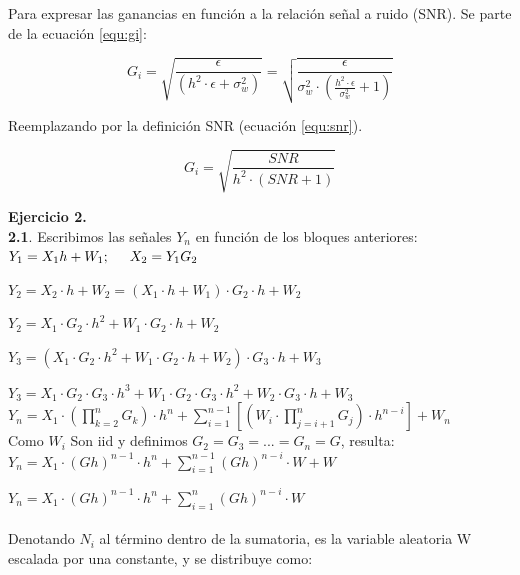 \hfill

Para expresar las ganancias en función a la relación señal a ruido (SNR). Se parte de la ecuación \ref{equ:gi}:

\begin{equation}
G_{i}  = \sqrt{ \frac{\epsilon}{(h^2 \cdot \epsilon + \sigma_w^2)}} = \sqrt{ \frac{\epsilon}{\sigma_w^2\cdot (\frac{h^2 \cdot \epsilon}{\sigma_w^2}+ 1)}} 
\label{equ:gi_2}
\end{equation}

Reemplazando por la definición SNR (ecuación \ref{equ:snr}).

\begin{equation}
G_{i}  = \sqrt{ \frac{SNR}{h^2\cdot (SNR + 1)}} 
\label{equ:gi_snr}
\end{equation}

\hfill

\textbf{Ejercicio 2.}\\

\textbf{2.1}. Escribimos las señales $Y_n$ en función de los bloques anteriores:\\

$Y_1 = X_1 h + W_1 ;\hspace{0.5 cm} X_2 = Y_1 G_2$

$Y_2 = X_2\cdot h + W_2 = (X_1\cdot h + W_1)\cdot G_2\cdot h + W_2$

$Y_2 = X_1\cdot G_2\cdot h^2 + W_1\cdot G_2\cdot h + W_2$

$Y_3 = (X_1\cdot G_2\cdot h^2 + W_1\cdot G_2\cdot h + W_2)\cdot G_3\cdot h + W_3$

$Y_3 = X_1\cdot G_2\cdot G_3 \cdot h^3 + W_1\cdot G_2\cdot G_3 \cdot h^2 + W_2\cdot G_3\cdot h + W_3$\\

$Y_n = X_1\cdot (\prod_{k=2}^nG_k)\cdot h^n + \sum_{i=1}^{n-1} [(W_i\cdot \prod_{j=i+1}^n G_j)\cdot h^{n-i}] + W_n$\\

Como $W_i$ Son iid y definimos $G_2 = G_3 =...= G_n = G$, resulta:\\

$Y_n =  X_1\cdot (Gh)^{n-1}\cdot h^n + \sum_{i=1}^{n-1} (Gh)^{n-i}\cdot W + W$

$Y_n =  X_1\cdot (Gh)^{n-1}\cdot h^n + \sum_{i=1}^n (Gh)^{n-i}\cdot W$\\

\\


Denotando $N_i$ al término dentro de la sumatoria, es la variable aleatoria W escalada por una constante, y se distribuye como:\\

